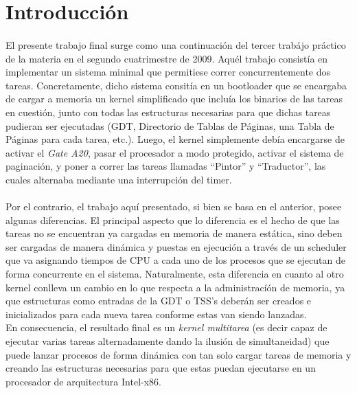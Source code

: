 \documentclass[11pt, a4paper]{article}
\begin{document}
	\maketitle

\small
\newpage \printindex \tableofcontents
\normalsize
\newpage

\section{Introducción}
\paragraph{}
El presente trabajo final surge como una continuación del tercer trabájo práctico de la materia en el segundo cuatrimestre de 2009. Aquél trabajo consistía en implementar un sistema minimal que permitiese correr concurrentemente dos tareas. Concretamente, dicho sistema consitía en un bootloader que se encargaba de cargar a memoria un kernel simplificado que incluía los binarios de las tareas en cuestión, junto con todas las estructuras necesarias para que dichas tareas pudieran ser ejecutadas (GDT, Directorio de Tablas de Páginas, una Tabla de Páginas para cada tarea, etc.). Luego, el kernel simplemente debía encargarse de activar el \textit{Gate A20}, pasar el procesador a modo protegido, activar el sistema de paginación, y poner a correr las tareas llamadas ``Pintor'' y ``Traductor'', las cuales alternaba mediante una interrupción del timer.

\paragraph{}
Por el contrario, el trabajo aquí presentado, si bien se basa en el anterior, posee algunas diferencias. El principal aspecto que lo diferencia es el hecho de que las tareas no se encuentran ya cargadas en memoria de manera estática, sino deben ser cargadas de manera dinámica y puestas en ejecución a través de un scheduler que va asignando tiempos de CPU a cada uno de los procesos que se ejecutan de forma concurrente en el sistema. Naturalmente, esta diferencia en cuanto al otro kernel conlleva un cambio en lo que respecta a la administracíón de memoria, ya que estructuras como entradas de la GDT o TSS's deberán ser creados e inicializados para cada nueva tarea conforme estas van siendo lanzadas.\\
En consecuencia, el resultado final es un \textit{kernel multitarea} (es decir capaz de ejecutar varias tareas alternadamente dando la ilusión de simultaneidad) que puede lanzar procesos de forma dinámica con tan solo cargar tareas de memoria y creando las estructuras necesarias para que estas puedan ejecutarse en un procesador de arquitectura Intel-x86.
\end{document}
